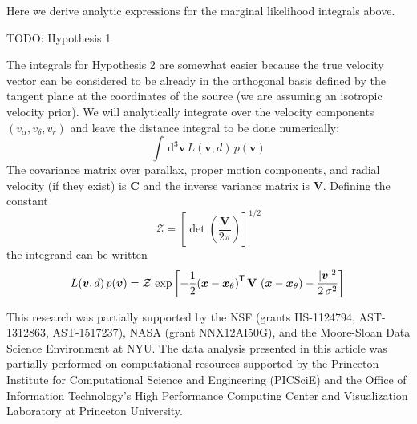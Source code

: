 \documentclass[manuscript, letterpaper]{aastex6}
\newcommand{\acronym}[1]{{\small{#1}}}
\newcommand{\dd}{\mathrm{d}}
\newcommand{\transp}[1]{{#1}^{\mathsf{T}}}
\newcommand{\bs}[1]{\boldsymbol{#1}}
\newcommand{\matrx}[1]{\mathbf{#1}}
\newcommand{\todo}[1]{{\color{red}TODO: #1}}
\begin{document}
\appendix

Here we derive analytic expressions for the marginal likelihood integrals above.

\todo{Hypothesis 1}

The integrals for Hypothesis 2 are somewhat easier because the true velocity
vector can be considered to be already in the orthogonal basis defined by the
tangent plane at the coordinates of the source (we are assuming an isotropic
velocity prior). We will analytically integrate over the velocity components
$(v_\alpha,v_\delta,v_r)$ and leave the distance integral to be done
numerically:
\begin{equation}
  \int \, \dd^3\bs{v} \, L(\bs{v}, d) \, p(\bs{v})
\end{equation}
The covariance matrix over parallax, proper motion components, and
radial velocity (if they exist) is $\matrx{C}$ and the inverse variance matrix
is $\matrx{V}$. Defining the constant
\begin{equation}
  \mathcal{Z} = \left[ \det \left(\frac{\matrx{V}}{2\pi} \right) \right]^{1/2}
\end{equation}
the integrand can be written
\begin{equation}
  L(\bs{v}, d) \, p(\bs{v}) = \mathcal{Z} \,
    \exp \left[ -\frac{1}{2} \transp{\left(\bs{x} - \bs{x}_\theta \right)} \,
    \matrx{V} \,
    \left(\bs{x} - \bs{x}_\theta \right)
    - \frac{|\bs{v}|^2}{2\,\sigma^2} \right] \\
\end{equation}

\acknowledgements

This research was partially supported by the \acronym{NSF} (grants
  \acronym{IIS-1124794}, \acronym{AST-1312863}, \acronym{AST-1517237}),
  \acronym{NASA} (grant \acronym{NNX12AI50G}),
  and the Moore-Sloan Data Science Environment at \acronym{NYU}. The data
analysis presented in this article was partially performed on computational
resources supported by the Princeton Institute for Computational Science and
Engineering (PICSciE) and the Office of Information Technology's High
Performance Computing Center and Visualization Laboratory at Princeton
University.

\end{document}
